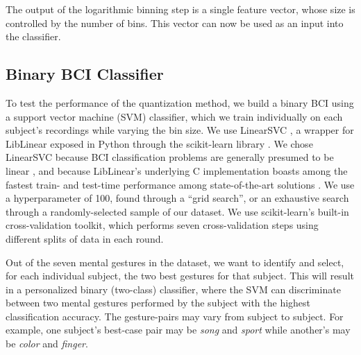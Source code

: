
The output of the logarithmic binning step is a single feature vector, whose size is controlled by the number of bins. This vector can now be used as an input into the classifier.

\subsection{Binary BCI Classifier}

To test the performance of the quantization method, we build a binary BCI using a support vector machine (SVM) classifier, which we train individually on each subject's recordings while varying the bin size. We use LinearSVC \cite{fan_liblinear:_2008}, a wrapper for LibLinear exposed in Python through the scikit-learn library \cite{pedregosa_scikit-learn:_2011}. We chose LinearSVC because BCI classification problems are generally presumed to be linear  \cite{garrett_comparison_2003,lotte_review_2007}, and because LibLinear's underlying C implementation boasts among the fastest train- and test-time performance among state-of-the-art solutions \cite{fan_liblinear:_2008}. We use a hyperparameter of 100, found through a ``grid search'', or an exhaustive search through a randomly-selected sample of our dataset. 
We use scikit-learn's built-in cross-validation toolkit, which performs seven cross-validation steps using different splits of data in each round.


Out of the seven mental gestures in the dataset, we want to identify and select, for each individual subject, the two best gestures for that subject. This will result in a personalized binary (two-class) classifier, where the SVM can discriminate between two mental gestures performed by the subject with the highest classification accuracy. The gesture-pairs may vary from subject to subject. For example, one subject's best-case pair may be \textit{song} and \textit{sport} while another's may be \textit{color} and \textit{finger}.

